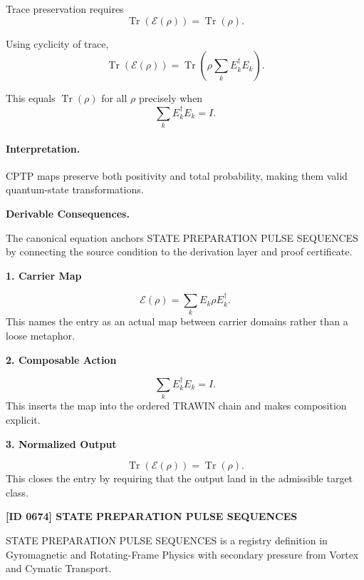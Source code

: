 Trace preservation requires
\begin{equation}
\operatorname{Tr}(\mathcal{E}(\rho))=\operatorname{Tr}(\rho).
\end{equation}

Using cyclicity of trace,
\begin{equation}
\operatorname{Tr}(\mathcal{E}(\rho))
=
\operatorname{Tr}\left(
\rho\sum_k E_k^\dagger E_k
\right).
\end{equation}

This equals $\operatorname{Tr}(\rho)$ for all $\rho$ precisely when
\begin{equation}
\boxed{
\sum_k E_k^\dagger E_k = I .
}
\end{equation}

\paragraph{Interpretation.}
CPTP maps preserve both positivity and total probability, making them valid quantum-state transformations.

\par\vspace{0.35em}
\noindent\textbf{Derivable Consequences.}\quad
\begingroup
\footnotesize
\raggedright
The canonical equation anchors STATE PREPARATION PULSE SEQUENCES by connecting the source condition to the derivation layer and proof certificate.
\par\endgroup

\noindent\textbf{1. Carrier Map}\par
\[
\mathcal{E}(\rho)=\sum_k E_k\rho E_k^\dagger.
\]
\noindent This names the entry as an actual map between carrier domains rather than a loose metaphor.\par
\noindent\textbf{2. Composable Action}\par
\[
\sum_k E_k^\dagger E_k = I.
\]
\noindent This inserts the map into the ordered TRAWIN chain and makes composition explicit.\par
\noindent\textbf{3. Normalized Output}\par
\[
\operatorname{Tr}(\mathcal{E}(\rho))=\operatorname{Tr}(\rho).
\]
\noindent This closes the entry by requiring that the output land in the admissible target class.\par

\clearpage
\noindent\textbf{[ID 0674] STATE PREPARATION PULSE SEQUENCES}\par
\vspace{0.35em}
\begingroup\small
{}
STATE PREPARATION PULSE SEQUENCES is a registry definition in Gyromagnetic and Rotating-Frame Physics with secondary pressure from Vortex and Cymatic Transport.

